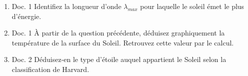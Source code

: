 \documentclass[10pt]{article}
\begin{document}
\begin{enumerate}
	\item  Doc. 1 Identifiez la longueur d’onde $λ_{max}$ pour laquelle le soleil émet le plus d’énergie.
	\item Doc. 1 À partir de la question précédente, déduisez graphiquement la température de la surface du Soleil. Retrouvez cette valeur par le calcul.
	\item Doc. 2 Déduisez-en le type d’étoile auquel appartient le Soleil selon la classification de Harvard.
\end{enumerate}
\end{document}

